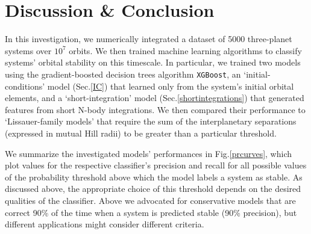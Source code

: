 \section{Discussion \& Conclusion} \label{conclusion}
In this investigation, we numerically integrated a dataset of 5000 three-planet systems over $10^7$ orbits.
We then trained machine learning algorithms to classify systems' orbital stability on this timescale.
In particular, we trained two models using the gradient-boosted decision trees algorithm {\tt XGBoost}, an `initial-conditions' model (Sec.\:\ref{IC}) that learned only from the system's initial orbital elements, and a `short-integration' model (Sec.\:\ref{shortintegrations}) that generated features from short N-body integrations.
We then compared their performance to `Lissauer-family models' that require the sum of the interplanetary separations (expressed in mutual Hill radii) to be greater than a particular threshold.

We summarize the investigated models' performances in Fig.\:\ref{prcurves}, which plot values for the respective classifier's precision and recall for all possible values of the probability threshold above which the model labels a system as stable.
As discussed above, the appropriate choice of this threshold depends on the desired qualities of the classifier.
Above we advocated for conservative models that are correct 90\% of the time when a system is predicted stable (90\% precision), but different applications might consider different criteria.

